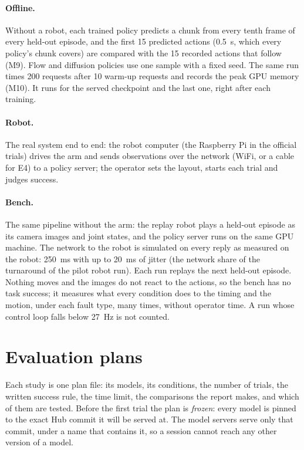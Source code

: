 \paragraph{Offline.}\label{sec:offline-design} Without a robot, each trained policy predicts a chunk from every tenth
frame of every held-out episode, and the first 15 predicted actions (0.5~s, which every policy's chunk covers) are
compared with the 15 recorded actions that follow (M9). Flow and diffusion policies use one sample with a fixed seed.
The same run times 200 requests after 10 warm-up requests and records the peak GPU memory (M10). It runs for the served
checkpoint and the last one, right after each training.

\paragraph{Robot.} The real system end to end: the robot computer (the Raspberry Pi in the official trials) drives the
arm and sends observations over the network (WiFi, or a cable for E4) to a policy server; the operator sets the layout, starts each trial and judges success.

\paragraph{Bench.}\label{sec:bench-design} The same pipeline without the arm: the replay robot plays a held-out episode
as its camera images and joint states, and the policy server runs on the same GPU machine. The network to the robot is
simulated on every reply as measured on the robot: 250~ms with up to 20~ms of jitter (the network share of the
turnaround of the pilot robot run). Each run replays the next held-out episode. Nothing moves and the images do not
react to the actions, so the bench has no task success; it measures what every condition does to the timing and the
motion, under each fault type, many times, without operator time. A run whose control loop falls below 27~Hz is not
counted.

\section{Evaluation plans}\label{sec:evalplans}

Each study is one plan file: its models, its conditions, the number of trials, the written success rule, the time
limit, the comparisons the report makes, and which of them are tested. Before the first trial the plan is
\emph{frozen}: every model is pinned to the exact Hub commit it will be served at. The model servers serve only that
commit, under a name that contains it, so a session cannot reach any other version of a model.

